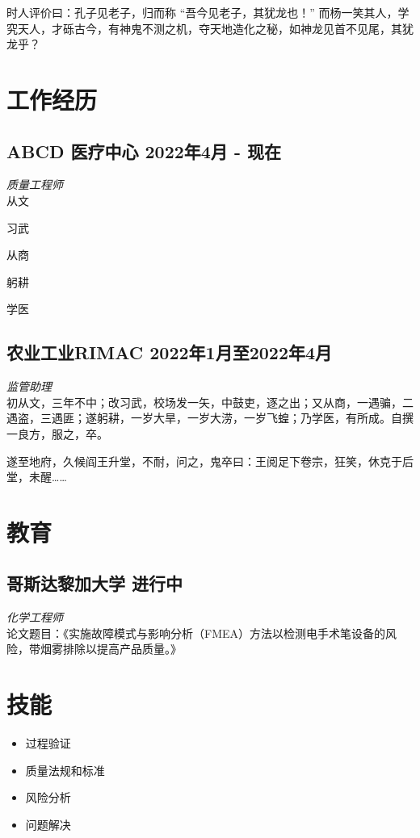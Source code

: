 \documentclass[a4paper,10pt]{article}
\begin{document}
时人评价曰：孔子见老子，归而称 “吾今见老子，其犹龙也！” 而杨一笑其人，学究天人，才砾古今，有神鬼不测之机，夺天地造化之秘，如神龙见首不见尾，其犹龙乎？



\section*{ 工作经历}

\subsection*{ABCD 医疗中心 \hfill 2022年4月 - 现在}
\textit{ 质量工程师} \\
从文

习武

从商

躬耕

学医

\subsection*{农业工业RIMAC \hfill 2022年1月至2022年4月}
\textit{ 监管助理} \\
初从文，三年不中；改习武，校场发一矢，中鼓吏，逐之出；又从商，一遇骗，二遇盗，三遇匪；遂躬耕，一岁大旱，一岁大涝，一岁飞蝗；乃学医，有所成。自撰一良方，服之，卒。

遂至地府，久候阎王升堂，不耐，问之，鬼卒曰：王阅足下卷宗，狂笑，休克于后堂，未醒……

\section*{ 教育}

\subsection*{哥斯达黎加大学 \hfill 进行中}
\textit{化学工程师}\\
论文题目：《实施故障模式与影响分析（FMEA）方法以检测电手术笔设备的风险，带烟雾排除以提高产品质量。》


\section*{ 技能}
\begin{center}
    \begin{itemize}[label=, itemsep=-3pt]
        \item 过程验证
        \item 质量法规和标准
        \item 风险分析
        \item 问题解决
    \end{itemize}
\end{center}
\end{document}
